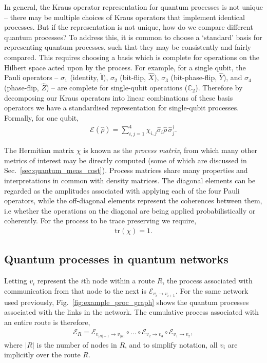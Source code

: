 \documentclass[aps,rmp,twocolumn,amsmath,amssymb,nofootinbib,superscriptaddress,longbibliography,floatfix]{revtex4-1}
\begin{document}
In general, the Kraus operator representation for quantum processes is not unique -- there may be multiple choices of Kraus operators that implement identical processes. But if the representation is not unique, how do we compare different quantum processes? To address this, it is common to choose a `standard' basis for representing quantum processes, such that they may be consistently and fairly compared. This requires choosing a basis which is complete for operations on the Hilbert space acted upon by the process. For example, for a single qubit, the Pauli operators -- $\sigma_1$ (identity, $\mathbb{\hat{I}}$), $\sigma_2$ (bit-flip, $\hat{X}$), $\sigma_3$ (bit-phase-flip, $\hat{Y}$), and $\sigma_4$ (phase-flip, $\hat{Z}$) -- are complete for single-qubit operations ($\mathbb{C}_2$). Therefore by decomposing our Kraus operators into linear combinations of these basis operators we have a standardised representation for single-qubit processes. Formally, for one qubit,
\begin{align}
\mathcal{E}(\hat\rho) = \sum_{i,j=1}^4 \chi_{i,j} \hat{\sigma}_i\hat\rho\,\hat{\sigma}_j^\dag.
\end{align}

The Hermitian matrix $\chi$ is known as the \emph{process matrix}, from which many other metrics of interest may be directly computed (some of which are discussed in Sec.~\ref{sec:quantum_meas_cost}). Process matrices share many properties and interpretations in common with density matrices. The diagonal elements can be regarded as the amplitudes associated with applying each of the four Pauli operators, while the off-diagonal elements represent the coherences between them, i.e whether the operations on the diagonal are being applied probabilistically or coherently. For the process to be trace preserving we require,
\begin{align}
\mathrm{tr}(\chi) = 1.
\end{align}

%
%

\subsection{Quantum processes in quantum networks} \label{sec:quant_proc_in}

Letting $v_i$ represent the $i$th node within a route $R$, the process associated with communication from that node to the next is $\mathcal{E}_{v_i\to v_{i+1}}$. For the same network used previously, Fig.~\ref{fig:example_proc_graph} shows the quantum processes associated with the links in the network. The cumulative process associated with an entire route is therefore,
\begin{align}
\mathcal{E}_R = \mathcal{E}_{{v_{|R|-1}}\to v_{|R|}} \circ \dots \circ \mathcal{E}_{v_2\to v_3} \circ \mathcal{E}_{v_1\to v_2},
\end{align}
where $|R|$ is the number of nodes in $R$, and to simplify notation, all $v_i$ are implicitly over the route $R$.
\end{document}
